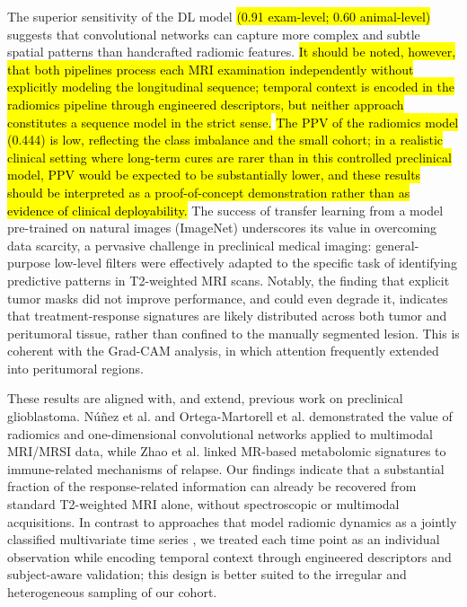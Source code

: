 \documentclass{article}
\begin{document}
The superior sensitivity of the DL model \hl{(0.91 exam-level; 0.60 animal-level)} suggests that convolutional networks can capture more complex and subtle spatial patterns than handcrafted radiomic features. \hl{It should be noted, however, that both pipelines process each MRI examination independently without explicitly modeling the longitudinal sequence; temporal context is encoded in the radiomics pipeline through engineered descriptors, but neither approach constitutes a sequence model in the strict sense.} \hl{The PPV of the radiomics model (0.444) is low, reflecting the class imbalance and the small cohort; in a realistic clinical setting where long-term cures are rarer than in this controlled preclinical model, PPV would be expected to be substantially lower, and these results should be interpreted as a proof-of-concept demonstration rather than as evidence of clinical deployability.} The success of transfer learning from a model pre-trained on natural images (ImageNet) underscores its value in overcoming data scarcity, a pervasive challenge in preclinical medical imaging: general-purpose low-level filters were effectively adapted to the specific task of identifying predictive patterns in T2-weighted MRI scans. Notably, the finding that explicit tumor masks did not improve performance, and could even degrade it, indicates that treatment-response signatures are likely distributed across both tumor and peritumoral tissue, rather than confined to the manually segmented lesion. This is coherent with the Grad-CAM analysis, in which attention frequently extended into peritumoral regions.

These results are aligned with, and extend, previous work on preclinical glioblastoma. Núñez et al. \cite{interpretingLuisMiguel} and Ortega-Martorell et al. \cite{Ortega-Martorell2023} demonstrated the value of radiomics and one-dimensional convolutional networks applied to multimodal MRI/MRSI data, while Zhao et al. \cite{Zhao2023} linked MR-based metabolomic signatures to immune-related mechanisms of relapse. Our findings indicate that a substantial fraction of the response-related information can already be recovered from standard T2-weighted MRI alone, without spectroscopic or multimodal acquisitions. In contrast to approaches that model radiomic dynamics as a jointly classified multivariate time series \cite{Prinzi2024}, we treated each time point as an individual observation while encoding temporal context through engineered descriptors and subject-aware validation; this design is better suited to the irregular and heterogeneous sampling of our cohort.
\end{document}
